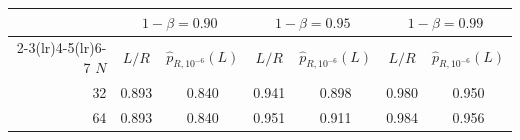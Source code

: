   \begin{tabular}{rcccccc}
    \toprule
     & \multicolumn{2}{c}{$1-\beta = 0.90$} & \multicolumn{2}{c}{$1-\beta = 0.95$} & \multicolumn{2}{c}{$1-\beta = 0.99$} \\
    \cmidrule(lr){2-3}\cmidrule(lr){4-5}\cmidrule(lr){6-7}
    $N$ & $L/R$ & $\widehat p_{R,10^{-6}}(L)$ & $L/R$ & $\widehat p_{R,10^{-6}}(L)$ & $L/R$ & $\widehat p_{R,10^{-6}}(L)$ \\
    \midrule
    32 & 0.893 & 0.840 & 0.941 & 0.898 & 0.980 & 0.950 \\
    64 & 0.893 & 0.840 & 0.951 & 0.911 & 0.984 & 0.956 \\
    \bottomrule
  \end{tabular}%
